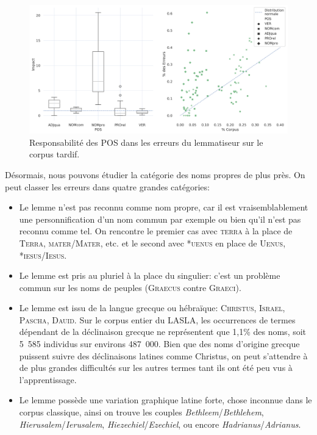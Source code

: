 \begin{figure}
    \centering
    \includegraphics[width=1\linewidth]{figures/chap3/extensibilite/LatinTardifPosErrorBoxPlot.png}
    \caption{Responsabilité des POS dans les erreurs du lemmatiseur sur le corpus tardif.}
    \label{fig:latin_tardif_error_pos}
\end{figure}

Désormais, nous pouvons étudier la catégorie des noms propres de plus près. On peut classer les erreurs dans quatre grandes catégories:
\begin{itemize}
    \item Le lemme n'est pas reconnu comme nom propre, car il est vraisemblablement une personnification d'un nom commun par exemple ou bien qu'il n'est pas reconnu comme tel. On rencontre le premier cas avec \textsc{terra} à la place de \textsc{Terra}, \textsc{mater}/\textsc{Mater}, etc. et le second avec *\textsc{uenus} en place de \textsc{Uenus}, *\textsc{iesus}/\textsc{Iesus}.
    \item Le lemme est pris au pluriel à la place du singulier: c'est un problème commun sur les noms de peuples (\textsc{Graecus} contre \textsc{Graeci}).
    \item Le lemme est issu de la langue grecque ou hébraïque: \textsc{Christus}, \textsc{Israel}, \textsc{Pascha}, \textsc{Dauid}. Sur le corpus entier du LASLA, les occurrences de termes dépendant de la déclinaison grecque ne représentent que 1,1\% des noms, soit 5~585 individus sur environs 487~000. Bien que des noms d'origine grecque puissent suivre des déclinaisons latines comme Christus, on peut s'attendre à de plus grandes difficultés sur les autres termes tant ils ont été peu vus à l'apprentissage.
    \item Le lemme possède une variation graphique latine forte, chose inconnue dans le corpus classique, ainsi on trouve les couples \textit{Bethleem}/\textit{Bethlehem}, \textit{Hierusalem}/\textit{Ierusalem}, \textit{Hiezechiel}/\textit{Ezechiel}, ou encore \textit{Hadrianus}/\textit{Adrianus}.
\end{itemize}

